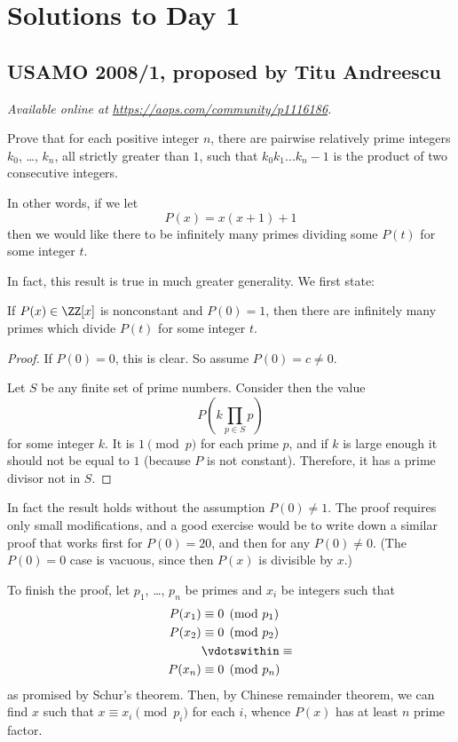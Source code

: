 \documentclass[11pt]{scrartcl}
\begin{document}
\section{Solutions to Day 1}
\subsection{USAMO 2008/1, proposed by Titu Andreescu}
\textsl{Available online at \url{https://aops.com/community/p1116186}.}
\begin{mdframed}[style=mdpurplebox,frametitle={Problem statement}]
Prove that for each positive integer $n$,
there are pairwise relatively prime integers $k_0$, \dots, $k_n$,
all strictly greater than $1$, such that
$k_0k_1 \dots k_n - 1$ is the product of two consecutive integers.
\end{mdframed}
In other words, if we let
\[ P(x) = x(x+1) + 1 \]
then we would like there to be infinitely many primes
dividing some $P(t)$ for some integer $t$.

In fact, this result is true in much greater generality.
We first state:
\begin{theorem}
  If $P(x) \in \ZZ[x]$ is nonconstant and $P(0) = 1$,
  then there are infinitely many primes
  which divide $P(t)$ for some integer $t$.
\end{theorem}
\begin{proof}
  If $P(0) = 0$, this is clear.
  So assume $P(0) = c \neq 0$.

  Let $S$ be any finite set of prime numbers.
  Consider then the value
  \[ P\left(k \prod_{p \in S} p\right) \]
  for some integer $k$.
  It is $1 \pmod p$ for each prime $p$,
  and if $k$ is large enough it should not be equal to $1$
  (because $P$ is not constant).
  Therefore, it has a prime divisor not in $S$.
\end{proof}
\begin{remark*}
  In fact the result holds without the assumption $P(0) \neq 1$.
  The proof requires only small modifications,
  and a good exercise would be to write down a similar
  proof that works first for $P(0) = 20$,
  and then for any $P(0) \neq 0$.
  (The $P(0) = 0$ case is vacuous,
  since then $P(x)$ is divisible by $x$.)
\end{remark*}

To finish the proof, let $p_1$, \dots, $p_n$ be primes
and $x_i$ be integers such that
\begin{align*}
  P(x_1) &\equiv 0 \pmod{p_1} \\
  P(x_2) &\equiv 0 \pmod{p_2} \\
  &\vdotswithin\equiv \\
  P(x_n) &\equiv 0 \pmod{p_n}
\end{align*}
as promised by Schur's theorem.
Then, by Chinese remainder theorem,
we can find $x$ such that $x \equiv x_i \pmod{p_i}$
for each $i$, whence $P(x)$ has at least $n$ prime factor.
\pagebreak
\end{document}
